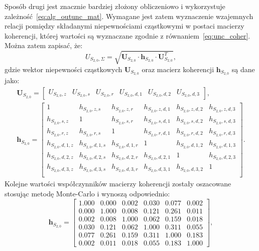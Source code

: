 Sposób drugi jest znacznie bardziej złożony obliczeniowo i wykorzystuje zależność~\eqref{eq:alg_outunc_mat}. Wymagane jest zatem wyznaczenie wzajemnych relacji pomiędzy składanymi niepewnościami cząstkowymi w postaci macierzy koherencji, której wartości są wyznaczane zgodnie z równaniem~\eqref{eq:unc_coher}. Można zatem zapisać, że:
\begin{equation}
U_{S_{2,0},\Sigma} = \sqrt{\mathbf{U}_{S_{2,0}} \cdot \mathbf{h}_{S_{2,0}} \cdot \mathbf{U}_{S_{2,0}}^{T}} \label{eq:sym_partd_output_unc_summul_S_2_0},
\end{equation}
gdzie wektor niepewności cząstkowych $\mathbf{U}_{S_{2,0}}$ oraz macierz koherencji $\mathbf{h}_{S_{2,0}}$ są dane jako:
\begin{gather}
\mathbf{U}_{S_{2,0}} =
\begin{bmatrix}
U_{S_{2,0},z} & U_{S_{2,0},s} & U_{S_{2,0},r} & U_{S_{2,0},d,1} & U_{S_{2,0},d,2} & U_{S_{2,0},d,3}
\end{bmatrix}
\label{eq:sym_partd_output_unc_sumuvect_S_2_0}, \\
\mathbf{h}_{S_{2,0}} =
\begin{bmatrix}
1                 & h_{S_{2,0},z,s}   & h_{S_{2,0},z,r}   & h_{S_{2,0},z,d,1} & h_{S_{2,0},z,d,2} & h_{S_{2,0},z,d,3} \\
h_{S_{2,0},s,z}   & 1                 & h_{S_{2,0},s,r}   & h_{S_{2,0},s,d,1} & h_{S_{2,0},s,d,2} & h_{S_{2,0},s,d,3} \\
h_{S_{2,0},r,z}   & h_{S_{2,0},r,s}   & 1                 & h_{S_{2,0},r,d,1} & h_{S_{2,0},r,d,2} & h_{S_{2,0},r,d,3} \\
h_{S_{2,0},d,1,z} & h_{S_{2,0},d,1,s} & h_{S_{2,0},d,1,r} & 1                 & h_{S_{2,0},d,1,2} & h_{S_{2,0},d,1,3} \\
h_{S_{2,0},d,2,z} & h_{S_{2,0},d,2,s} & h_{S_{2,0},d,2,r} & h_{S_{2,0},d,2,1} & 1                 & h_{S_{2,0},d,2,3} \\
h_{S_{2,0},d,3,z} & h_{S_{2,0},d,3,s} & h_{S_{2,0},d,3,r} & h_{S_{2,0},d,3,1} & h_{S_{2,0},d,3,2} & 1                 \\
\end{bmatrix}
\label{eq:sym_partd_output_unc_sumcoher_S_2_0}.
\end{gather}
Kolejne wartości współczynników macierzy koherencji zostały oszacowane stosując metodę Monte-Carlo i wynoszą odpowiednio:
\begin{equation}
\mathbf{h}_{S_{2,0}} =
\begin{bmatrix}
1.000 & 0.000 & 0.002 & 0.030 & 0.077 & 0.002 \\
0.000 & 1.000 & 0.008 & 0.121 & 0.261 & 0.011 \\
0.002 & 0.008 & 1.000 & 0.062 & 0.159 & 0.018 \\
0.030 & 0.121 & 0.062 & 1.000 & 0.311 & 0.055 \\
0.077 & 0.261 & 0.159 & 0.311 & 1.000 & 0.183 \\
0.002 & 0.011 & 0.018 & 0.055 & 0.183 & 1.000
\end{bmatrix}
\label{eq:sym_partd_output_unc_sumcoherval_S_2_0},
\end{equation}
